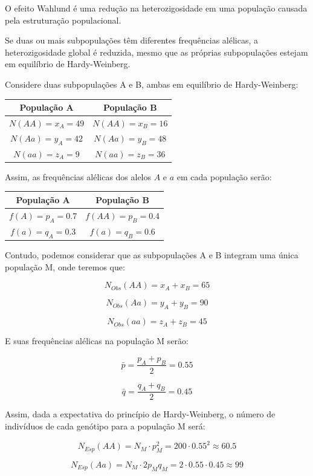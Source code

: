 \documentclass[
]{book}
\begin{document}
O efeito Wahlund é uma redução na heterozigosidade em uma população causada pela estruturação populacional.

Se duas ou mais subpopulações têm diferentes frequências alélicas, a heterozigosidade global é reduzida, mesmo que as próprias subpopulações estejam em equilíbrio de Hardy-Weinberg.

Considere duas subpopulações A e B, ambas em equilíbrio de Hardy-Weinberg:

\begin{longtable}[]{@{}cc@{}}
\toprule()
População A & População B \\
\midrule()
\endhead
\(N(AA) = x_A = 49\) & \(N(AA) = x_B = 16\) \\
\(N(Aa) = y_A = 42\) & \(N(Aa) = y_B = 48\) \\
\(N(aa) = z_A = 9\) & \(N(aa) = z_B = 36\) \\
\bottomrule()
\end{longtable}

Assim, as frequências alélicas dos alelos \(A\) e \(a\) em cada população serão:

\begin{longtable}[]{@{}cc@{}}
\toprule()
População A & População B \\
\midrule()
\endhead
\(f(A) = p_A = 0.7\) & \(f(AA) = p_B = 0.4\) \\
\(f(a) = q_A = 0.3\) & \(f(a) = q_B = 0.6\) \\
\bottomrule()
\end{longtable}

Contudo, podemos considerar que as subpopulações A e B integram uma única população M, onde teremos que:

\[N_{Obs}(AA) = x_A + x_B = 65\]

\[N_{Obs}(Aa) = y_A + y_B = 90\]

\[N_{Obs}(aa) = z_A + z_B = 45\]

E suas frequências alélicas na população M serão:

\[\bar{p} = \frac{p_A + p_B}{2} = 0.55\]

\[\bar{q} = \frac{q_A + q_B}{2} = 0.45\]

Assim, dada a expectativa do princípio de Hardy-Weinberg, o número de indivíduos de cada genótipo para a população M será:

\[N_{Esp}(AA) = N_M\cdot p_M^2 = 200 \cdot 0.55^2 \approx 60.5\]

\[N_{Esp}(Aa) = N_M\cdot 2p_Mq_M = 2 \cdot 0.55 \cdot 0.45 \approx 99\]
\end{document}
